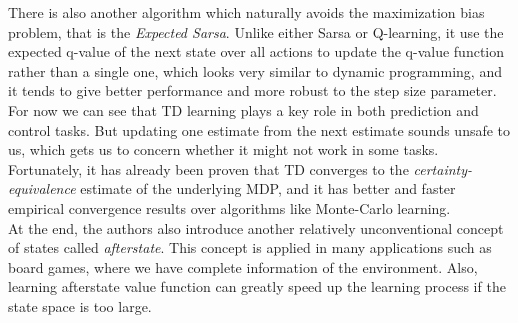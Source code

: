 \documentclass[12pt,a4paper]{article}
\begin{document}
There is also another algorithm which naturally avoids the maximization bias problem, that is the \textit{Expected Sarsa}. Unlike either Sarsa or Q-learning, it use the expected q-value of the next state over all actions to update the q-value function rather than a single one, which looks very similar to dynamic programming, and it tends to give better performance and more robust to the step size parameter.\\

For now we can see that TD learning plays a key role in both prediction and control tasks. But updating one estimate from the next estimate sounds unsafe to us, which gets us to concern whether it might not work in some tasks. Fortunately, it has already been proven that TD converges to the \textit{certainty-equivalence} estimate of the underlying MDP, and it has better and faster empirical convergence results over algorithms like Monte-Carlo learning. \\

At the end, the authors also introduce another relatively unconventional concept of states called \textit{afterstate}. This concept is applied in many applications such as board games, where we have complete information of the environment. Also, learning afterstate value function can greatly speed up the learning process if the state space is too large.
\end{document}
